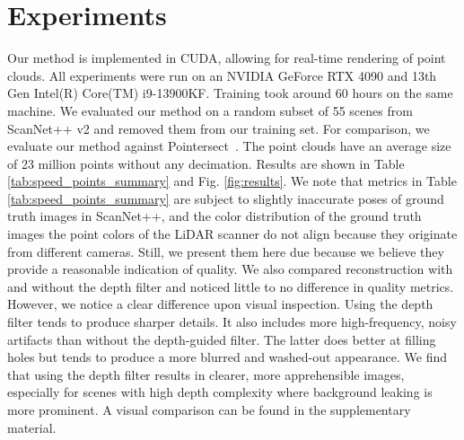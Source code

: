 \documentclass[twocolumn]{article}
\begin{document}
\begin{table}[h]
\caption{This table compares our method to Pointersect~\cite{pointersect} at two resolutions: 1920$\times$1440 and 960$\times$720, using full-size point clouds. We evaluate both methods with PSNR, LPIPS, SSIM, and rendering speed. Our method outperforms Pointersect in image quality and is over 2000 times faster in rendering.}
\label{tab:speed_points_summary}
\centering
{}
\end{table}

\section{Experiments}
Our method is implemented in CUDA, allowing for real-time rendering of point clouds. All experiments were run on an NVIDIA GeForce RTX 4090 and 13th Gen Intel(R) Core(TM) i9-13900KF. Training took around 60 hours on the same machine. We evaluated our method on a random subset of 55 scenes from ScanNet++ v2 and removed them from our training set. For comparison, we evaluate our method against Pointersect~\cite{pointersect}. The point clouds have an average size of 23 million points without any decimation. Results are shown in Table \ref{tab:speed_points_summary} and Fig. \ref{fig:results}. We note that metrics in Table \ref{tab:speed_points_summary} are subject to slightly inaccurate poses of ground truth images in ScanNet++, and the color distribution of the ground truth images the point colors of the LiDAR scanner do not align because they originate from different cameras. Still, we present them here due because we believe they provide a reasonable indication of quality. We also compared reconstruction with and without the depth filter and noticed little to no difference in quality metrics. However, we notice a clear difference upon visual inspection. Using the depth filter tends to produce sharper details. It also includes more high-frequency, noisy artifacts than without the depth-guided filter. The latter does better at filling holes but tends to produce a more blurred and washed-out appearance. We find that using the depth filter results in clearer, more apprehensible images, especially for scenes with high depth complexity where background leaking is more prominent. A visual comparison can be found in the supplementary material.
\end{document}
